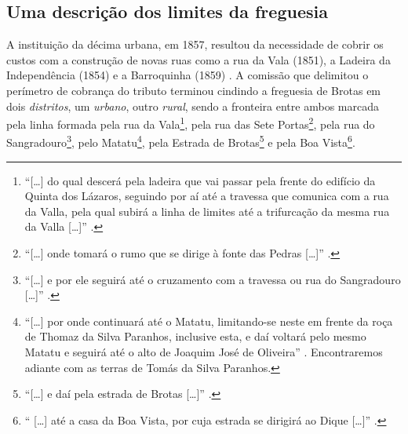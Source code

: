 
\subsection{Uma descrição dos limites da freguesia}\label{subsec:descrit}

A instituição da décima urbana, em 1857, resultou da necessidade de cobrir os custos com a construção de novas ruas como a rua da Vala (1851), a Ladeira da Independência (1854) e a Barroquinha (1859) \cite[p.~309]{ruy_camara_1953}. A comissão que delimitou o perímetro de cobrança do tributo terminou cindindo a freguesia de Brotas em dois \textit{distritos}, um \textit{urbano}, outro \textit{rural}, sendo a fronteira entre ambos marcada pela linha formada pela rua da Vala\footnote{``[\dots] do qual descerá pela ladeira que vai passar pela frente do edifício da Quinta dos Lázaros, seguindo por aí até a travessa que comunica com a rua da Valla, pela qual subirá a linha de limites até a trifurcação da mesma rua da Valla [\dots]'' \cite[pp.~309-310]{ruy_camara_1953}.}, pela rua das Sete Portas\footnote{``[\dots] onde tomará o rumo que se dirige à fonte das Pedras [\dots]'' \cite[pp.~309-310]{ruy_camara_1953}.}, pela rua do Sangradouro\footnote{``[\dots] e por ele seguirá até o cruzamento com a travessa ou rua do Sangradouro [\dots]'' \cite[p.~310]{ruy_camara_1953}.}, pelo Matatu\footnote{``[\dots] por onde continuará até o Matatu, limitando-se neste em frente da roça de Thomaz da Silva Paranhos, inclusive esta, e daí voltará pelo mesmo Matatu e seguirá até o alto de Joaquim José de Oliveira'' \cite[p.~310]{ruy_camara_1953}. Encontraremos adiante com as terras de Tomás da Silva Paranhos.}, pela Estrada de Brotas\footnote{``[\dots] e daí pela estrada de Brotas [\dots]'' \cite[p.~310]{ruy_camara_1953}.} e pela Boa Vista\footnote{`` [\dots] até a casa da Boa Vista, por cuja estrada se dirigirá ao Dique [\dots]'' \cite[p.~310]{ruy_camara_1953}.}. 

